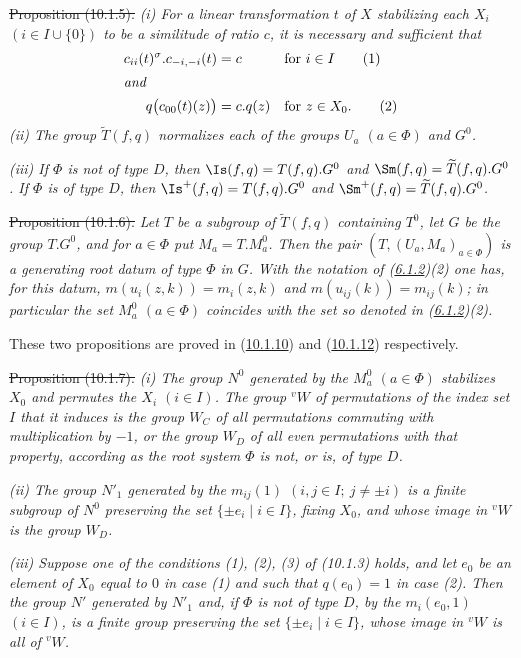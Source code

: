 \documentclass[12pt,a4paper,oneside,english]{smfart}
\newcommand{\btref}[1]{\hyperlink{bt:#1}{#1}}
\theoremstyle{definition}
\theoremstyle{bt}
\begin{document}
\st{Proposition (10.1.5).}
\emph{(i) For a linear transformation $t$ of $X$ stabilizing each $X_i$
$(i\in I\cup\{0\})$ to be a similitude of ratio $c$, it is necessary and
sufficient that}
\begin{align}
c_{ii}(t)^{\sigma}.c_{-i,-i}(t)&=c &&\text{for } i\in I \tag{1}\\
\intertext{\emph{and}}
q\bigl(c_{00}(t)(z)\bigr)&=c.q(z) &&\text{for } z\in X_0. \tag{2}
\end{align}
\emph{(ii) The group $\widetilde T(f,q)$ normalizes each of the groups $U_a$
$(a\in\Phi)$ and $G^{0}$.}

\emph{(iii) If $\Phi$ is not of type $D$, then $\Is(f,q)=T(f,q).G^{0}$ and
$\Sm(f,q)=\widetilde T(f,q).G^{0}$. If $\Phi$ is of type $D$, then
$\Is^{+}(f,q)=T(f,q).G^{0}$ and $\Sm^{+}(f,q)=\widetilde T(f,q).G^{0}$.}

\st{Proposition (10.1.6).}
\emph{Let $T$ be a subgroup of $\widetilde T(f,q)$ containing $T^{0}$, let $G$
be the group $T.G^{0}$, and for $a\in\Phi$ put $M_a=T.M^{0}_a$. Then the pair
$(T,(U_a,M_a)_{a\in\Phi})$ is a generating root datum of type $\Phi$ in $G$.
With the notation of (\btref{6.1.2})(2) one has, for this datum,
$m(u_i(z,k))=m_i(z,k)$ and $m(u_{ij}(k))=m_{ij}(k)$; in particular the set
$M^{0}_a$ $(a\in\Phi)$ coincides with the set so denoted in (\btref{6.1.2})(2).}

\smallskip
These two propositions are proved in (\btref{10.1.10}) and (\btref{10.1.12}) respectively.

\st{Proposition (10.1.7).}
\emph{(i) The group $N^{0}$ generated by the $M^{0}_a$ $(a\in\Phi)$ stabilizes
$X_0$ and permutes the $X_i$ $(i\in I)$. The group ${}^{v}W$ of permutations of
the index set $I$ that it induces is the group $W_C$ of all permutations
commuting with multiplication by $-1$, or the group $W_D$ of all even
permutations with that property, according as the root system $\Phi$ is not, or
is, of type $D$.}

\emph{(ii) The group $N'_1$ generated by the $m_{ij}(1)$ $(i,j\in I;\
j\neq\pm i)$ is a finite subgroup of $N^{0}$ preserving the set
$\{\pm e_i\mid i\in I\}$, fixing $X_0$, and whose image in ${}^{v}W$ is the
group $W_D$.}

\emph{(iii) Suppose one of the conditions (1), (2), (3) of (10.1.3) holds, and
let $e_0$ be an element of $X_0$ equal to $0$ in case (1) and such that
$q(e_0)=1$ in case (2). Then the group $N'$ generated by $N'_1$ and, if $\Phi$
is not of type $D$, by the $m_i(e_0,1)$ $(i\in I)$, is a finite group preserving
the set $\{\pm e_i\mid i\in I\}$, whose image in ${}^{v}W$ is all of
${}^{v}W$.}
\end{document}
